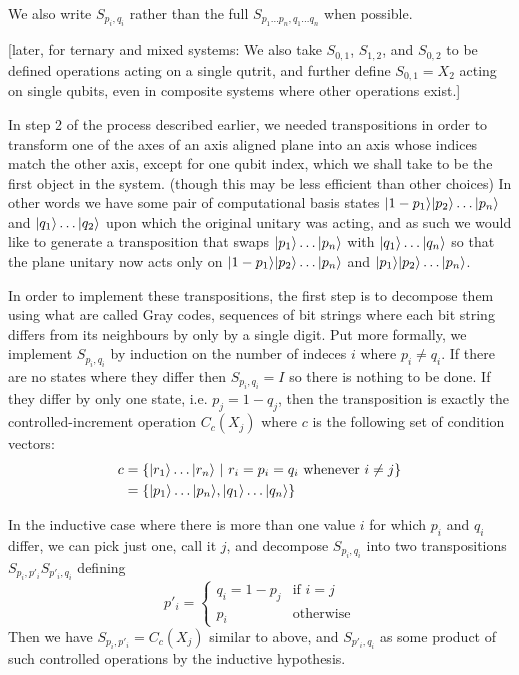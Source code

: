 We also write $S_{p_i, q_i}$ rather than the full $S_{p_1\dots p_n, q_1\dots q_n}$ when possible.

[later, for ternary and mixed systems: We also take $S_{0,1}$, $S_{1,2}$, and $S_{0,2}$ to be defined operations acting on a single qutrit, and further define $S_{0,1} = X_2$ acting on single qubits, even in composite systems where other operations exist.]

In step 2 of the process described earlier, we needed transpositions in order to transform one of the axes of an axis aligned plane into an axis whose indices match the other axis, except for one qubit index, which we shall take to be the first object in the system. (though this may be less efficient than other choices) In other words we have some pair of computational basis states $| 1-p_1 \rangle| p_2 \rangle\dots| p_n \rangle$ and $| q_1 \rangle\dots| q_2 \rangle$ upon which the original unitary was acting, and as such we would like to generate a transposition that swaps $| p_1 \rangle\dots | p_n \rangle$ with $| q_1 \rangle\dots| q_n \rangle$ so that the plane unitary now acts only on $| 1-p_1 \rangle| p_2 \rangle\dots | p_n \rangle$ and $| p_1 \rangle| p_2 \rangle\dots | p_n \rangle$.

In order to implement these transpositions, the first step is to decompose them using what are called Gray codes, sequences of bit strings where each bit string differs from its neighbours by only by a single digit. Put more formally, we implement $S_{p_i,q_i}$ by induction on the number of indeces $i$ where $p_i \neq q_i$. If there are no states where they differ then $S_{p_i,q_i} = I$ so there is nothing to be done. If they differ by only one state, i.e. $p_j = 1 - q_j$, then the transposition is exactly the controlled-increment operation $C_c(X_j)$ where $c$ is the following set of condition vectors:
\begin{align*}
c &= \{\ket{r_1}\dots\ket{r_n}\ |\ r_i = p_i = q_i \text{\ whenever\ } i \neq j\}
\\&= \{\ket{p_1}\dots\ket{p_n}, \ket{q_1}\dots\ket{q_n}\}
\end{align*}

In the inductive case where there is more than one value $i$ for which $p_i$ and $q_i$ differ, we can pick just one, call it $j$, and decompose $S_{p_i, q_i}$ into two transpositions $S_{p_i, p'_i}S_{p'_i, q_i}$ defining
\[p'_i = \begin{cases}
q_i = 1 - p_j & \text{if\ } i = j \\
p_i & \text{otherwise}
\end{cases}\]
Then we have $S_{p_i, p'_i} = C_c(X_j)$ similar to above, and $S_{p'_i, q_i}$ as some product of such controlled operations by the inductive hypothesis.


